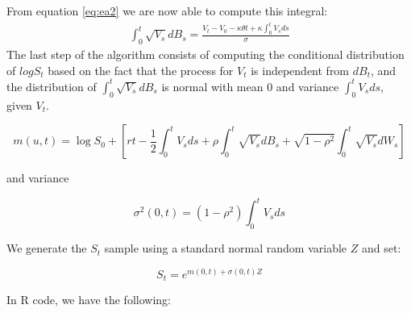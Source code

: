 \documentclass[12pt,twoside]{reedthesis}
\theoremstyle{definition}
\theoremstyle{definition}
\theoremstyle{remark}
\begin{document}
  From equation \eqref{eq:ea2} we are now able to compute this integral:
  \begin{align} \label{eq:ea3}
  \int_{0}^{t}{\sqrt{V_s} dB_s} = \frac{V_t - V_0 - \kappa \theta t + \kappa \int_{0}^{t}{V_s ds}}{\sigma} 
  \end{align}
  The last step of the algorithm consists of computing the conditional
  distribution of \(log S_t\) based on the fact that the process for
  \(V_t\) is independent from \(dB_t\), and the distribution of
  \(\displaystyle \int_0^t{\sqrt{V_s} dB_s}\) is normal with mean \(0\)
  and variance \(\displaystyle \int_0^t{V_s ds}\), given \(V_t\).
  
  \[m(u,t) = \log S_0 + \left[ r t - \frac{1}{2} \int_{0}^{t}{V_s ds} + \rho  \int_{0}^{t}{\sqrt{V_s} d B_s} + \sqrt{1 - \rho^2} \int_{0}^{t}{\sqrt{V_s} dW_s}\right]\]
  
  and variance
  
  \[\sigma^2(0,t) = \left( 1 - \rho^2 \right) \int_0^t{V_s ds}\]
  
  We generate the \(S_t\) sample using a standard normal random variable
  \(Z\) and set:
  
  \[S_t = e^{m(0,t) + \sigma (0,t) Z}\]
  
  In R code, we have the following:
  \begin{Shaded}
  \begin{Highlighting}[]
  \StringTok{ }\NormalTok{(}\OperatorTok{/}\OperatorTok{*}\StringTok{ }\OperatorTok{-}\StringTok{ }\OperatorTok{-}\StringTok{ }\OperatorTok{*}\StringTok{ }\OperatorTok{*}\StringTok{ }\OperatorTok{+}\StringTok{ }\OperatorTok{*}\StringTok{ }
    
  \StringTok{ }\OperatorTok{+}\StringTok{ }\OperatorTok{*}\StringTok{ }\OperatorTok{-}\StringTok{ }\OperatorTok{-}\StringTok{ }\NormalTok{(}\OperatorTok{/}\NormalTok{) }\OperatorTok{*}\StringTok{ }\OperatorTok{+}\StringTok{ }\OperatorTok{*}\StringTok{ }
  \StringTok{ }\NormalTok{((} \OperatorTok{-}\StringTok{ }\OperatorTok{^}\NormalTok{)) }\OperatorTok{*}\StringTok{ }
  \StringTok{ }\OperatorTok{+}\StringTok{ }\OperatorTok{*}\StringTok{ }\OperatorTok{::}\NormalTok{(}\NormalTok{))}
  \end{Highlighting}
  \end{Shaded}
\end{document}
